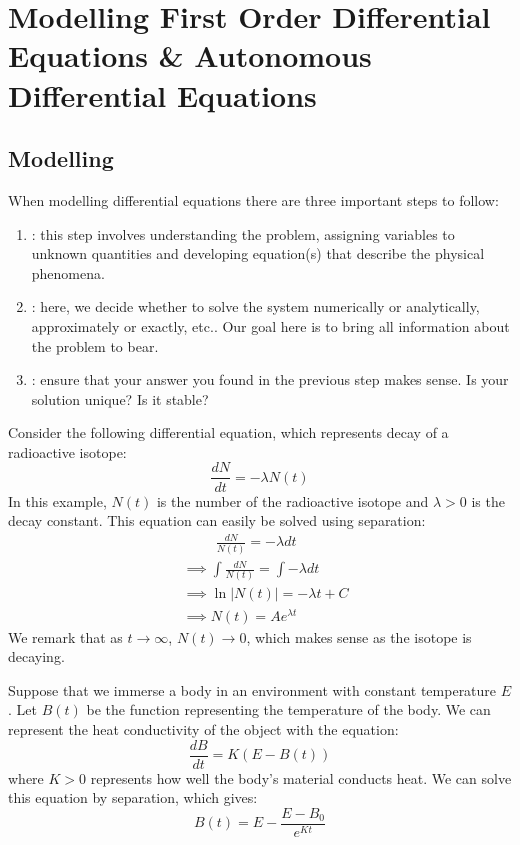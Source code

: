 \section{Modelling First Order Differential Equations \& Autonomous Differential Equations}

\subsection{Modelling}

When modelling differential equations there are three important steps to follow:
\begin{enumerate}
    \item {}: this step involves understanding the problem, assigning variables to unknown quantities and developing equation(s) that describe the physical phenomena.
    \item {}: here, we decide whether to solve the system numerically or analytically, approximately or exactly, etc.. Our goal  here is to bring all information about the problem to bear.
    \item {}: ensure that your answer you found in the previous step makes sense. Is your solution unique? Is it stable?
\end{enumerate}

\begin{example}
    Consider the following differential equation, which represents decay of a radioactive isotope:
    \[\frac{dN}{dt} = -\lambda N(t)\]
    In this example, $N(t)$ is the number of the radioactive isotope and $\lambda > 0$ is the decay constant. This equation can easily be solved using separation:
    \begin{align*}
        &\hspace{1cm}\frac{dN}{N(t)}= -\lambda dt \\
        & \implies \int \frac{dN}{N(t)} = \int -\lambda dt \\
        & \implies \ln|N(t)| = -\lambda t + C \\ 
        & \implies N(t) = Ae^{\lambda t}
    \end{align*}
    We remark that as $t \to \infty$, $N(t) \to 0$, which makes sense as the isotope is decaying.
\end{example}

\begin{example}
    Suppose that we immerse a body in an environment with constant temperature $E$. Let $B(t)$ be the function representing the temperature of the body. We can represent the heat conductivity of the object with the equation:
    \[\frac{dB}{dt} = K(E - B(t))\]
    where $K > 0$ represents how well the body's material conducts heat. We can solve this equation by separation, which gives:
    \[B(t) = E - \frac{E - B_0}{e^{Kt}}\]
\end{example}

